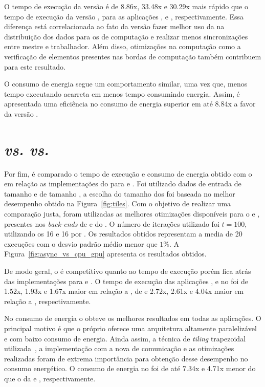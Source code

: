 O tempo de execução da versão \async é de 8.86x, 33.48x e 30.29x mais rápido que o tempo de execução da versão   \ipc, para as aplicações \fur, \gol e \jacobi, respectivamente. Essa diferença está correlacionada ao fato da versão \async fazer melhor uso da \noc na distribuição dos dados para os \cluster de computação e realizar menos sincronizações entre mestre e trabalhador. Além disso, otimizações na computação como a verificação de elementos presentes nas bordas de computação também contribuem para este resultado.

O consumo de energia segue um comportamento similar, uma vez que, menos tempo executando acarreta em menos tempo consumindo energia. Assim, é apresentada uma eficiência no consumo de energia superior em até 8.84x a favor da versão \async.

\section{\mppa \async \textit{vs.} \cpu \textit{vs.} \gpu}
\label{sec:async_vs_cpu_gpu}

Por fim, é comparado o tempo de execução e consumo de energia obtido com o \pskelmppa \async em relação as implementações do \pskel para \cpu e \gpu. Foi utilizado dados de entrada de tamanho \ind e \tiles de tamanho \tiled, a escolha do tamanho dos \tiles foi baseada no melhor desempenho obtido na Figura~\ref{fig:tiles}. Com o objetivo de realizar uma comparação justa, foram utilizadas as melhores otimizações disponíveis para o \xeon e \tesla, presentes nos \textit{back-ends} de \multicore e \gpu do \pskel. O número de iterações utilizado foi $t = 100$, utilizando os 16 \clusters e 16 \pes por \cluster. Os resultados obtidos representam a media de 20 execuções com o desvio padrão médio menor que $1\%$. A Figura~\ref{fig:async_vs_cpu_gpu} apresenta os resultados obtidos.

De modo geral, o \pskelmppa \async é competitivo quanto ao tempo de execução porém fica atrás das implementações para \cpu e \gpu. O tempo de execução das aplicações \convolution, \gol e \jacobi no \mppa foi de 1.52x, 1.93x e 1.67x maior em relação a \cpu, de  e 2.72x, 2.61x e 4.04x maior em relação a \gpu, respectivamente.

No consumo de energia o \pskelmppa \async obteve os melhores resultados em todas as aplicações. O principal motivo é que o próprio \mppa oferece uma arquitetura altamente paralelizável e com baixo consumo de energia. Ainda assim, a técnica de \textit{tiling} trapezoidal utilizada~\cite{Podesta:TCC}, a implementação com a nova \api de comunicação \async e as otimizações realizadas foram de extrema importância para obtenção desse desempenho no consumo energético. O consumo de energia no \mppa foi de até 7.34x e 4.71x menor do que o da \cpu e \gpu, respectivamente.

